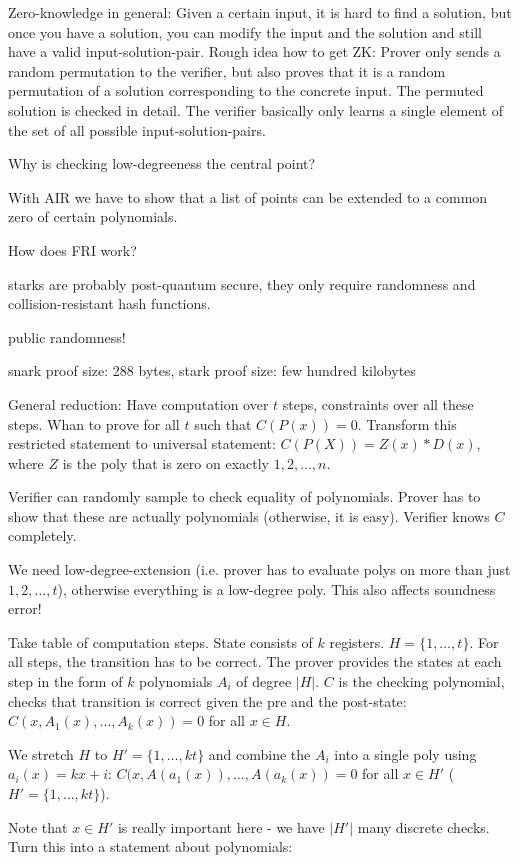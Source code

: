 \documentclass[11pt,letterpaper]{article}
\begin{document}
Zero-knowledge in general: Given a certain input, it is hard to find a solution, but once you have a solution, you
can modify the input and the solution and still have a valid input-solution-pair. Rough idea how to get ZK:
Prover only sends a random permutation to the verifier, but also proves that it is a random permutation of a solution
corresponding to the concrete input. The permuted solution is checked in detail. The verifier basically only learns
a single element of the set of all possible input-solution-pairs.

Why is checking low-degreeness the central point?

With AIR we have to show that a list of points can be extended to a common zero of certain polynomials.

How does FRI work?

starks are probably post-quantum secure, they only require randomness and collision-resistant hash functions.

public randomness!

snark proof size: 288 bytes, stark proof size: few hundred kilobytes


General reduction: Have computation over $t$ steps, constraints over all these steps. Whan to prove for all $t$
such that $C(P(x)) = 0$. Transform this restricted statement to universal statement: $C(P(X)) = Z(x)*D(x)$,
where $Z$ is the poly that is zero on exactly $1,2,\dots,n$.

Verifier can randomly sample to check equality of polynomials. Prover has to show that these are actually polynomials
(otherwise, it is easy). Verifier knows $C$ completely.

We need low-degree-extension (i.e. prover has to evaluate polys on more than just $1,2,\dots,t$), otherwise everything is a low-degree poly. This also affects soundness error!


Take table of computation steps. State consists of $k$ registers. $H = \{1,\dots,t\}$. For all steps, the
transition has to be correct.
The prover provides the states
at each step in the form of $k$ polynomials $A_i$ of degree $|H|$. $C$ is the checking polynomial, checks that
transition is correct given
the pre and the post-state: $C(x, A_1(x), \dots, A_k(x)) = 0$ for all $x \in H$.

We stretch $H$ to $H'=\{1,\dots,kt\}$ and combine the $A_i$ into a single poly using $a_i(x) = kx+i$:
$C(x, A(a_1(x)), \dots, A(a_k(x)) = 0$ for all $x \in H'$ ($H' = \{1,\dots, kt\}$).

Note that $x \in H'$ is really important here - we have $|H'|$ many discrete checks.
Turn this into a statement about polynomials:
\end{document}
